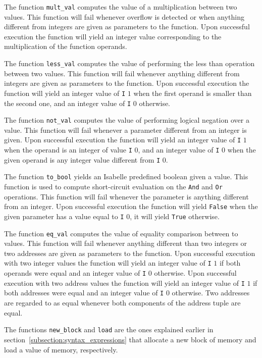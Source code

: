 The function \verb|mult_val| computes the value of a multiplication between two values.
This function will fail whenever overflow is detected or when anything different from integers are given as parameters to the function.
Upon successful execution the function will yield an integer value corresponding to the multiplication of the function operands.

The function \verb|less_val| computes the value of performing the less than operation between two values.
This function will fail whenever anything different from integers are given as parameters to the function.
Upon successful execution the function will yield an integer value of \verb|I| $1$ when the first operand is smaller than the second one, and an integer value of \verb|I| $0$ otherwise.

The function \verb|not_val| computes the value of performing logical negation over a value.
This function will fail whenever a parameter different from an integer is given.
Upon successful execution the function will yield an integer value of \verb|I| $1$ when the operand is an integer of value \verb|I| $0$, and an integer value of \verb|I| $0$ when the given operand is any integer value different from \verb|I| $0$.

The function \verb|to_bool| yields an Isabelle predefined boolean given a value.
This function is used to compute short-circuit evaluation on the \verb|And| and \verb|Or| operations.
This function will fail whenever the parameter is anything different from an integer.
Upon successful execution the function will yield \verb|False| when the given parameter has a value equal to \verb|I| $0$, it will yield \verb|True| otherwise.

The function \verb|eq_val| computes the value of equality comparison between to values.
This function will fail whenever anything different than two integers or two addresses are given as parameters to the function.
Upon successful execution with two integer values the function will yield an integer value of \verb|I| $1$ if both operands were equal and an integer value of \verb|I| $0$ otherwise.
Upon successful execution with two address values the function will yield an integer value of \verb|I| $1$ if both addresses were equal and an integer value of \verb|I| $0$ otherwise.
Two addresses are regarded to as equal whenever both components of the address tuple are equal.

The functions \verb|new_block| and \verb|load| are the ones explained earlier in section~\ref{subsection:syntax_expressions} that allocate a new block of memory and load a value of memory, respectively.


